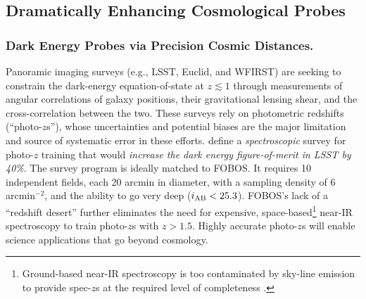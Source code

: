 

\subsection{Dramatically Enhancing Cosmological Probes}

\subsubsection{Dark Energy Probes via Precision Cosmic Distances.}
\label{sec:cosmology}

Panoramic imaging surveys (e.g., LSST, Euclid, and WFIRST) are seeking to constrain the dark-energy
equation-of-state at $z \lesssim 1$ through measurements of angular correlations of galaxy positions, their
gravitational lensing shear, and the cross-correlation between the two.  These surveys rely on photometric redshifts
(``photo-$z$s''), whose uncertainties and potential biases are the major limitation and source of systematic error in
these efforts.  \citet{newman15} define a \emph{spectroscopic} survey for photo-$z$ training that would \emph{increase
the dark energy figure-of-merit in LSST by 40\%}.  The survey program is ideally matched to FOBOS.  It requires 10
independent fields, each 20 arcmin in diameter, with a sampling density of 6 arcmin$^{-2}$, and the ability to go very
deep ($i_{\rm AB} < 25.3$).  FOBOS's lack of a ``redshift desert'' further eliminates the need for expensive, space-based\footnote{Ground-based near-IR spectroscopy is too contaminated by
sky-line emission to provide spec-$z$s at the required level of completeness \citep{newman15}.} near-IR spectroscopy to train photo-$z$s with $z > 1.5$.  Highly accurate photo-$z$s will enable science applications that go beyond cosmology.


